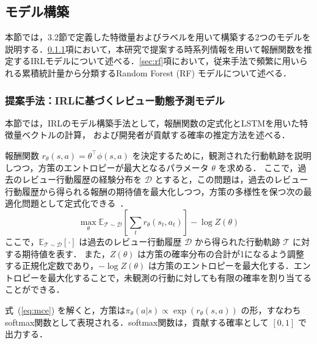 \documentclass[submit,noauthor,ses,dvipdfmx]{ipsj}
\begin{document}
\vspace{-2mm}
\subsection{モデル構築}

本節では，3.2節で定義した特徴量およびラベルを用いて構築する2つのモデルを説明する．\ref{sec:irl}項において，本研究で提案する時系列情報を用いて報酬関数を推定するIRLモデルについて述べる．\ref{sec:rf}項において，従来手法で頻繁に用いられる累積統計量から分類するRandom Forest (RF) モデルについて述べる．

\subsubsection{提案手法：IRLに基づくレビュー動態予測モデル}\label{sec:irl}

本節では，IRLのモデル構築手法として，報酬関数の定式化とLSTMを用いた特徴量ベクトルの計算，
および開発者が貢献する確率の推定方法を述べる．

報酬関数 $r_\theta(s,a) = \theta^\top \phi(s,a)$ を決定するために，観測された行動軌跡を説明しつつ，方策のエントロピーが最大となるパラメータ $\theta$ を求める．
ここで，過去のレビュー行動履歴の経験分布を $\mathcal{D}$ とすると，この問題は，過去のレビュー行動履歴から得られる報酬の期待値を最大化しつつ，方策の多様性を保つ次の最適化問題として定式化できる~\cite{ziebart}．
\begin{equation}
\max_\theta \mathbb{E}_{\mathcal{T} \sim \mathcal{D}}
\left[\sum_t r_\theta(s_t, a_t)\right] - \log Z(\theta)
\label{eq:mce}
\end{equation}
ここで，$\mathbb{E}_{\mathcal{T} \sim \mathcal{D}}[\cdot]$ は過去のレビュー行動履歴 $\mathcal{D}$ から得られた行動軌跡 $\mathcal{T}$ に対する期待値を表す．
また，$Z(\theta)$ は方策の確率分布の合計が1になるよう調整する正規化定数であり，$-\log Z(\theta)$ は方策のエントロピーを最大化する．エントロピーを最大化することで，未観測の行動に対しても有限の確率を割り当てることができる．

式~(\ref{eq:mce}) を解くと，方策は$\pi_\theta(a|s) \propto \exp(r_\theta(s,a))$ の形，すなわちsoftmax関数として表現される．softmax関数は，貢献する確率として $[0, 1]$ で出力する．
\end{document}
